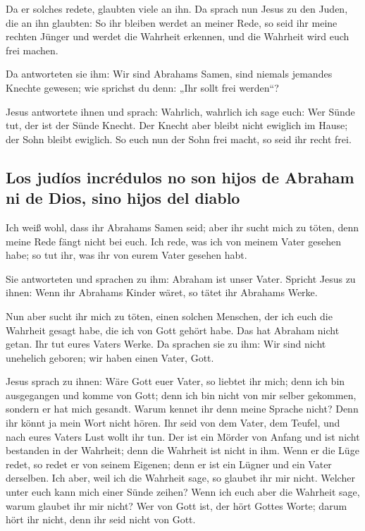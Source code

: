  Da er solches redete, glaubten viele an ihn.
 Da sprach nun Jesus zu den Juden, die an ihn glaubten:
So ihr bleiben werdet an meiner Rede, so seid ihr meine rechten Jünger
 und werdet die Wahrheit erkennen, und die Wahrheit wird
euch frei machen.

 Da antworteten sie ihm: Wir sind Abrahams Samen, sind
niemals jemandes Knechte gewesen; wie sprichst du denn: „Ihr sollt frei
werden``?

 Jesus antwortete ihnen und sprach: Wahrlich, wahrlich
ich sage euch: Wer Sünde tut, der ist der Sünde Knecht. 
Der Knecht aber bleibt nicht ewiglich im Hause; der Sohn bleibt
ewiglich.  So euch nun der Sohn frei macht, so seid ihr
recht frei.

\hypertarget{los-juduxedos-incruxe9dulos-no-son-hijos-de-abraham-ni-de-dios-sino-hijos-del-diablo}{%
\subsection{Los judíos incrédulos no son hijos de Abraham ni de Dios,
sino hijos del
diablo}\label{los-juduxedos-incruxe9dulos-no-son-hijos-de-abraham-ni-de-dios-sino-hijos-del-diablo}}

 Ich weiß wohl, dass ihr Abrahams Samen seid; aber ihr
sucht mich zu töten, denn meine Rede fängt nicht bei euch.
 Ich rede, was ich von meinem Vater gesehen habe; so tut
ihr, was ihr von eurem Vater gesehen habt.

 Sie antworteten und sprachen zu ihm: Abraham ist unser
Vater. Spricht Jesus zu ihnen: Wenn ihr Abrahams Kinder wäret, so tätet
ihr Abrahams Werke.

 Nun aber sucht ihr mich zu töten, einen solchen
Menschen, der ich euch die Wahrheit gesagt habe, die ich von Gott gehört
habe. Das hat Abraham nicht getan.  Ihr tut eures Vaters
Werke. Da sprachen sie zu ihm: Wir sind nicht unehelich geboren; wir
haben einen Vater, Gott.

 Jesus sprach zu ihnen: Wäre Gott euer Vater, so liebtet
ihr mich; denn ich bin ausgegangen und komme von Gott; denn ich bin
nicht von mir selber gekommen, sondern er hat mich gesandt.
 Warum kennet ihr denn meine Sprache nicht? Denn ihr
könnt ja mein Wort nicht hören.  Ihr seid von dem Vater,
dem Teufel, und nach eures Vaters Lust wollt ihr tun. Der ist ein Mörder
von Anfang und ist nicht bestanden in der Wahrheit; denn die Wahrheit
ist nicht in ihm. Wenn er die Lüge redet, so redet er von seinem
Eigenen; denn er ist ein Lügner und ein Vater derselben. 
Ich aber, weil ich die Wahrheit sage, so glaubet ihr mir nicht.
 Welcher unter euch kann mich einer Sünde zeihen? Wenn
ich euch aber die Wahrheit sage, warum glaubet ihr mir nicht?
 Wer von Gott ist, der hört Gottes Worte; darum hört ihr
nicht, denn ihr seid nicht von Gott.

